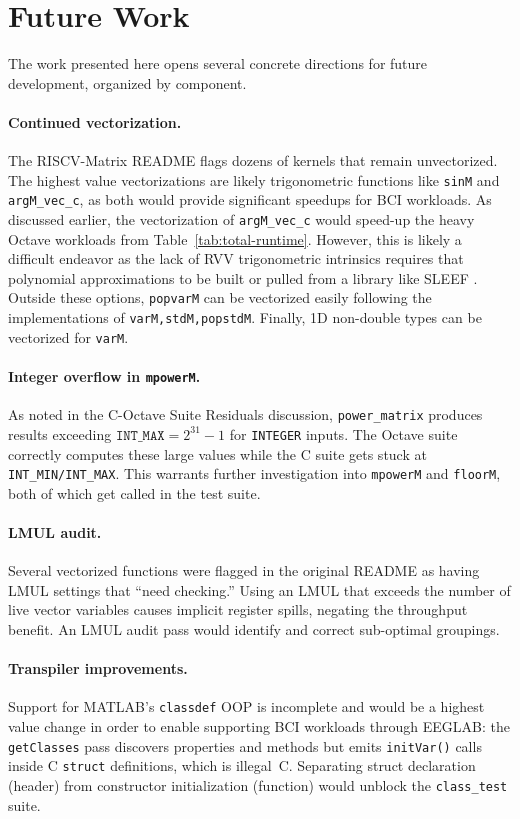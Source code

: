 \section{Future Work}

The work presented here opens several concrete directions for future development, organized by component.

\paragraph{Continued vectorization.}
The RISCV-Matrix README flags dozens of kernels that remain unvectorized. The highest value vectorizations are likely trigonometric functions like \texttt{sinM} and \texttt{argM\_vec\_c}, as both would provide significant speedups for BCI workloads. As discussed earlier, the vectorization of \texttt{argM\_vec\_c} would speed-up the heavy Octave workloads from Table~\ref{tab:total-runtime}. However, this is likely a difficult endeavor as the lack of RVV trigonometric intrinsics requires that polynomial approximations to be built or pulled from  a library like SLEEF \cite{sleef}. Outside these options, \texttt{popvarM} can be vectorized easily following the implementations of \texttt{varM,stdM,popstdM}. Finally, 1D non-double types can be vectorized for \texttt{varM}.

\paragraph{Integer overflow in \texttt{mpowerM}.}
As noted in the C-Octave Suite Residuals discussion, \texttt{power\_matrix} produces results exceeding $\texttt{INT\_MAX} = 2^{31} - 1$ for \texttt{INTEGER} inputs. The Octave suite correctly computes these large values while the C suite gets stuck at \texttt{INT\_MIN/INT\_MAX}. This warrants further investigation into \texttt{mpowerM} and \texttt{floorM}, both of which get called in the test suite.

\paragraph{LMUL audit.}
Several vectorized functions were flagged in the original README as having LMUL settings that ``need checking.'' Using an LMUL that exceeds the number of live vector variables causes implicit register spills, negating the throughput benefit. An LMUL audit pass would identify and correct sub-optimal groupings.

\paragraph{Transpiler improvements.} 
Support for MATLAB's \texttt{classdef} OOP is incomplete and would be a highest value change in order to enable supporting BCI workloads through EEGLAB: the \texttt{getClasses} pass discovers properties and methods but emits \texttt{initVar()} calls inside C \texttt{struct} definitions, which is illegal~C. Separating struct declaration (header) from constructor initialization (function) would unblock the \texttt{class\_test} suite.

